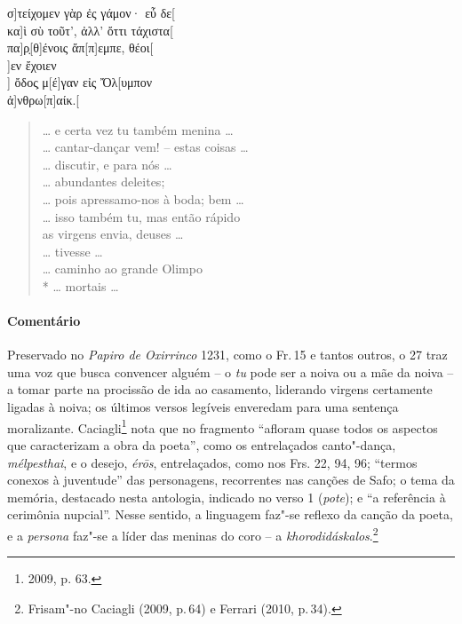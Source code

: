 {\begin{gkverse}
σ]τείχομεν γὰρ ἐς γάμον· εὖ δε[\\
κα]ὶ σὺ τοῦτ’, ἀλλ’ ὄττι τάχιστα[\\
πα]ρ̣[θ]ένοις ἄπ[π]εμπε, θέοι[\\
]εν ἔχοιεν\\
      ] ὄδος̣ μ[έ]γαν εἰς Ὄλ[υμπον\\
       ἀ]νθρω[π\qquad]αίκ.[
\end{gkverse}
\pagebreak
\begin{verse}
\ldots{} e certa vez tu também menina \ldots{}\\
\ldots{} cantar-dançar vem! -- estas coisas \ldots{}\\
\ldots{} discutir, e para nós \ldots{}\\
\ldots{} abundantes deleites;\\
\ldots{} pois apressamo-nos à boda; bem \ldots{}\\
\ldots{} isso também tu, mas então rápido\\
as virgens envia, deuses \ldots{}\\
\ldots{} tivesse \ldots{}\\
\ldots{} caminho ao grande Olimpo\\*
\ldots{} mortais \ldots{}
\end{verse}

\medskip

{\paragraph{Comentário} Preservado no \textit{Papiro de Oxirrinco} 1231, como o Fr.\,15 e tantos outros, o 27 traz uma voz que busca convencer alguém  -- o \textit{tu}
pode ser a noiva ou a mãe da noiva -- a tomar parte na procissão de
ida ao casamento, liderando virgens certamente ligadas à noiva; os últimos versos
legíveis enveredam para uma sentença moralizante.
Caciagli\footnote{2009, p. 63.} nota que no fragmento ``afloram quase todos os aspectos que caracterizam a obra da poeta'', como os entrelaçados canto"-dança, \textit{mélpesthai}, e o desejo, \textit{érōs}, entrelaçados, como nos Frs. 22, 94, 96; ``termos conexos à juventude'' das personagens, recorrentes nas canções de Safo; o tema da memória, destacado nesta antologia, indicado no verso 1 (\textit{pote}); e ``a referência à cerimônia nupcial''. Nesse sentido, a linguagem faz"-se reflexo da canção da poeta, e a \textit{persona} faz"-se a líder das meninas do coro -- a \textit{khorodidáskalos}.\footnote{Frisam"-no Caciagli (2009, p.\,64) e Ferrari (2010, p.\,34).}}



}
